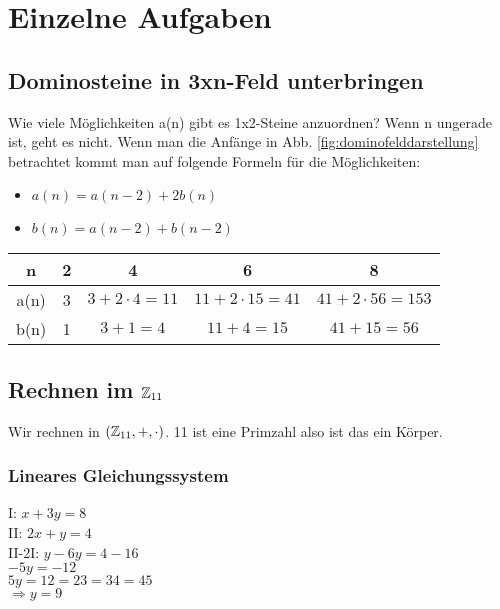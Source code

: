 \renewcommand{\ldate}{2015-06-22}	%

\section{Einzelne Aufgaben}

\subsection{Dominosteine in 3xn-Feld unterbringen}
Wie viele Möglichkeiten a(n) gibt es 1x2-Steine anzuordnen? Wenn n ungerade ist, geht es nicht. 
Wenn man die Anfänge in Abb. \ref{fig:dominofelddarstellung} betrachtet kommt man auf folgende Formeln für die Möglichkeiten: 

\begin{itemize}
\item $a(n)=a(n-2)+2 b(n)$
\item $b(n)=a(n-2)+b (n-2)$
\end{itemize}

\begin{tabular}{|c|c|c|c|c|}
\hline n & 2 & 4 & 6 & 8 \\ 
\hline a(n) & 3 & $3+2\cdot 4=11$ & $11+2\cdot 15=41$ & $41+2\cdot 56=153$ \\ 
\hline b(n) & 1 & $3+1=4$ & $11+4=15$ & $41+15=56$ \\ 
\hline 
\end{tabular} 

\subsection{Rechnen im $\mathbb{Z}_{11}$}
Wir rechnen in $(\mathbb{Z}_{11},+,\cdot)$. 11 ist eine Primzahl also ist das ein Körper. 

\subsubsection{Lineares Gleichungssystem}
I: $x+3y=8$\\
II: $2x+y=4$\\

II-2I: $y-6y=4-16$\\
$-5y=-12$\\
$5y=12=23=34=45$\\
$\Rightarrow y=9$\\

